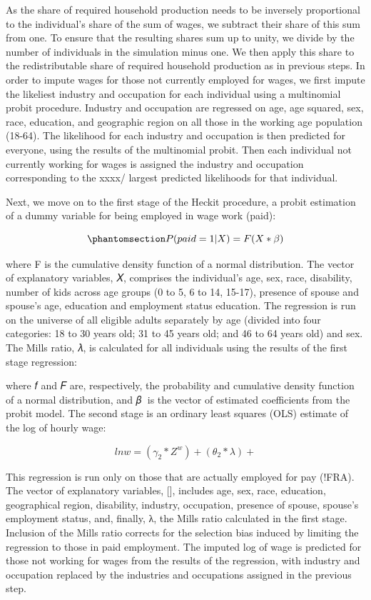 \documentclass[
  11pt,
]{article}
\begin{document}
As the share of required household production needs to be inversely
proportional to the individual's share of the sum of wages, we subtract
their share of this sum from one. To ensure that the resulting shares
sum up to unity, we divide by the number of individuals in the
simulation minus one. We then apply this share to the redistributable
share of required household production as in previous steps. In order to
impute wages for those not currently employed for wages, we first impute
the likeliest industry and occupation for each individual using a
multinomial probit procedure. Industry and occupation are regressed on
age, age squared, sex, race, education, and geographic region on all
those in the working age population (18-64). The likelihood for each
industry and occupation is then predicted for everyone, using the
results of the multinomial probit. Then each individual not currently
working for wages is assigned the industry and occupation corresponding
to the xxxx/ largest predicted likelihoods for that individual.

Next, we move on to the first stage of the Heckit procedure, a probit
estimation of a dummy variable for being employed in wage work (paid):

\begin{equation}\phantomsection\label{eq-probit}{P(paid=1|X)=F(X* \beta)
}\end{equation}

where F is the cumulative density function of a normal distribution. The
vector of explanatory variables, 𝑋, comprises the individual's age, sex,
race, disability, number of kids across age groups (0 to 5, 6 to 14,
15-17), presence of spouse and spouse's age, education and employment
status education. The regression is run on the universe of all eligible
adults separately by age (divided into four categories: 18 to 30 years
old; 31 to 45 years old; and 46 to 64 years old) and sex. The Mills
ratio, 𝜆, is calculated for all individuals using the results of the
first stage regression:

where 𝑓 and 𝐹 are, respectively, the probability and cumulative density
function of a normal distribution, and 𝛽􏱞 is the vector of estimated
coefficients from the probit model. The second stage is an ordinary
least squares (OLS) estimate of the log of hourly wage:

\[lnw= (\gamma_2*Z^w) + (\theta_2 * \lambda) +
\]

This regression is run only on those that are actually employed for pay
(!FRA). The vector of explanatory variables, {[}{]}, includes age, sex,
race, education, geographical region, disability, industry, occupation,
presence of spouse, spouse's employment status, and, finally, λ, the
Mills ratio calculated in the first stage. Inclusion of the Mills ratio
corrects for the selection bias induced by limiting the regression to
those in paid employment. The imputed log of wage is predicted for those
not working for wages from the results of the regression, with industry
and occupation replaced by the industries and occupations assigned in
the previous step.
\end{document}
